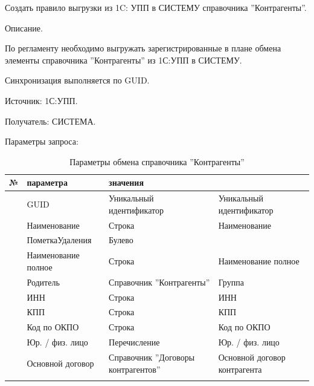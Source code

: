 




Создать правило выгрузки из 1C: УПП в СИСТЕМУ справочника ''Контрагенты''.


Описание.

По регламенту необходимо выгружать зарегистрированные в плане обмена элементы справочника ''Контрагенты'' из 1С:УПП в СИСТЕМУ.

Синхронизация выполняется по GUID.

Источник: 1С:УПП.

Получатель: СИСТЕМА.

Параметры запроса:
\pc
\scriptsize
\begin{longtable}{|p{10mm}|p{35mm}|p{40mm}|p{60mm}|}
\hline
\parbox[c][5mm]{10mm}{\centering№} & \parbox[c]{35mm}{ параметра} & \parbox[c]{40mm}{ значения} & \parbox[c]{60mm}{} \\
\hline
\parbox[c][5mm]{16mm}{\p} &  GUID &  Уникальный идентификатор & Уникальный идентификатор \\
\hline
\parbox[c][5mm]{16mm}{\p} & Наименование &     Строка & Наименование \\
\hline
\parbox[c][5mm]{16mm}{\p} & ПометкаУдаления & Булево & \\
\hline
\parbox[c][5mm]{16mm}{\p} & Наименование полное &     Строка & Наименование полное \\
\hline
\parbox[c][5mm]{16mm}{\p} &   Родитель &  Справочник ''Контрагенты'' & Группа \\
\hline
\parbox[c][5mm]{16mm}{\p} &        ИНН &     Строка &        ИНН \\
\hline
\parbox[c][5mm]{16mm}{\p} &        КПП &     Строка &        КПП \\
\hline
\parbox[c][5mm]{16mm}{\p} & Код по ОКПО &     Строка &   Код по ОКПО \\
\hline
\parbox[c][5mm]{16mm}{\p} & Юр. / физ. лицо &  Перечисление & Юр. / физ. лицо  \\
\hline
\parbox[c][5mm]{16mm}{\p} & Основной договор & Справочник ''Договоры контрагентов'' & Основной договор контрагента \\
\hline
\caption{Параметры обмена справочника ''Контрагенты''}\label{ex:customer}
\end{longtable}  
\normalsize




